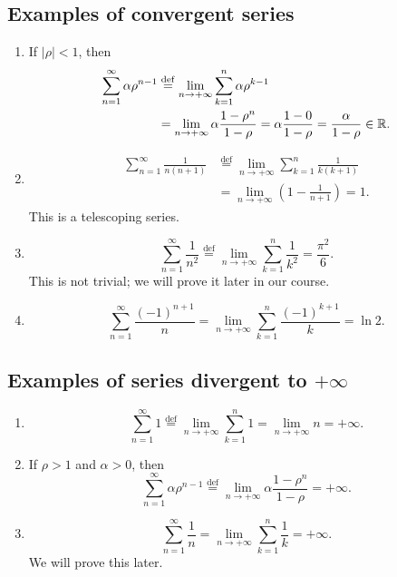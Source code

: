 \subsection*{Examples of convergent series}
\begin{enumerate}[label=\arabic*)]
\item If $|\rho|<1$, then
\begin{align*}
\sum_{n=1}^{\infty}\alpha\rho^{n-1}
&\overset{\mathrm{def}}{=}
\lim_{n\to+\infty}\sum_{k=1}^{n}\alpha\rho^{k-1}\\
&=\lim_{n\to+\infty}\alpha\frac{1-\rho^n}{1-\rho}
=\alpha\frac{1-0}{1-\rho}
=\frac{\alpha}{1-\rho}\in\mathbb{R}.
\end{align*}

\item
\begin{align*}
\sum_{n=1}^{\infty}\frac1{n(n+1)}
&\overset{\mathrm{def}}{=}
\lim_{n\to+\infty}\sum_{k=1}^{n}\frac1{k(k+1)}\\
&=\lim_{n\to+\infty}\left(1-\frac1{n+1}\right)=1.
\end{align*}
This is a telescoping series.

\item
\[
\sum_{n=1}^{\infty}\frac1{n^2}
\overset{\mathrm{def}}{=}
\lim_{n\to+\infty}\sum_{k=1}^{n}\frac1{k^2}
=\frac{\pi^2}{6}.
\]
This is not trivial; we will prove it later in our course.

\item
\[
\sum_{n=1}^{\infty}\frac{(-1)^{n+1}}{n}
=\lim_{n\to+\infty}\sum_{k=1}^{n}\frac{(-1)^{k+1}}{k}
=\ln 2.
\]
\end{enumerate}

\subsection*{Examples of series divergent to $+\infty$}
\begin{enumerate}[label=\arabic*)]
\item
\[
\sum_{n=1}^{\infty}1
\overset{\mathrm{def}}{=}
\lim_{n\to+\infty}\sum_{k=1}^{n}1
=\lim_{n\to+\infty}n=+\infty.
\]

\item If $\rho>1$ and $\alpha>0$, then
\[
\sum_{n=1}^{\infty}\alpha\rho^{n-1}
\overset{\mathrm{def}}{=}
\lim_{n\to+\infty}\alpha\frac{1-\rho^n}{1-\rho}
=+\infty.
\]

\item
\[
\sum_{n=1}^{\infty}\frac1n
=\lim_{n\to+\infty}\sum_{k=1}^{n}\frac1k
=+\infty.
\]
We will prove this later.
\end{enumerate}

